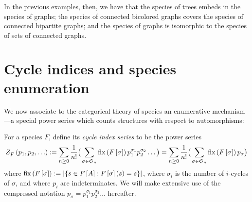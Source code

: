 \documentclass[distribution,draft]{brandiss} %
\numberwithin{section}{chapter}
\numberwithin{figure}{chapter}
\begin{document}
In the previous examples, then, we have that the species of trees embeds in the species of graphs; the species of connected bicolored graphs covers the species of connected bipartite graphs; and the species of graphs is isomorphic to the species of sets of connected graphs.

\section{Cycle indices and species enumeration}\label{s:cycind}
We now associate to the categorical theory of species an enumerative mechanism---a special power series which counts structures with respect to automorphisms:
\begin{definition}
  \label{def:cycind}
  For a species $F$, define its \emph{cycle index series} to be the power series
  \begin{equation}
    \label{eq:cycinddef}
     Z_{F}^{} \left( {p_{1}, p_{2}, \dots} \right)  := \sum_{n \geq 0} \frac{1}{n!} \big( \sum_{\sigma \in  \mathfrak{S}_{n} } \operatorname{fix} \left( {F \left[ {\sigma} \right]} \right) p_{1}^{\sigma_{1}} p_{2}^{\sigma_{2}} \dots \big) = \sum_{n \geq 0} \frac{1}{n!} \big( \sum_{\sigma \in  \mathfrak{S}_{n} } \operatorname{fix} \left( {F \left[ {\sigma} \right]} \right) p_{\sigma} \big)
  \end{equation}
  where $\operatorname{fix} \left( {F \left[ {\sigma} \right]} \right) := \left\vert {\ensuremath{\left\{ {s \in F \left[ {A} \right] : F \left[ {\sigma} \right] \left( {s} \right) = s} \right\}}} \right\vert$, where $\sigma_{i}$ is the number of $i$-cycles of $\sigma$, and where $p_{i}$ are indeterminates.
  We will make extensive use of the compressed notation $p_{\sigma} = p_{1}^{\sigma_{1}} p_{2}^{\sigma_{2}} \dots$ hereafter.
\end{definition}
\end{document}
